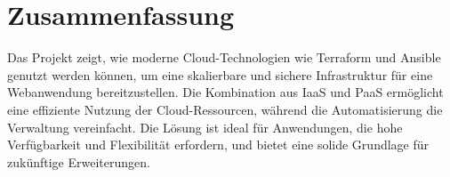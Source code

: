 \chapter{Zusammenfassung}
Das Projekt zeigt, wie moderne Cloud-Technologien wie Terraform und Ansible genutzt werden können, um eine skalierbare und sichere Infrastruktur für eine Webanwendung bereitzustellen. Die Kombination aus IaaS und PaaS ermöglicht eine effiziente Nutzung der Cloud-Ressourcen, während die Automatisierung die Verwaltung vereinfacht. Die Lösung ist ideal für Anwendungen, die hohe Verfügbarkeit und Flexibilität erfordern, und bietet eine solide Grundlage für zukünftige Erweiterungen.